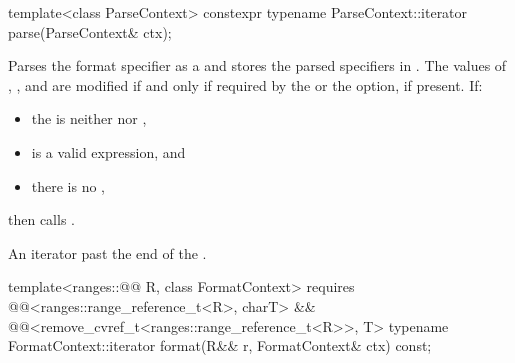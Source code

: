 %
\begin{itemdecl}
template<class ParseContext>
  constexpr typename ParseContext::iterator
    parse(ParseContext& ctx);
\end{itemdecl}

\begin{itemdescr}
\pnum
\effects
Parses the format specifier as a  and
stores the parsed specifiers in .
The values of
, , and 
are modified if and only if required by
the  or the  option, if present.
If:
\begin{itemize}
\item
the  is neither  nor ,
\item
{} is a valid expression, and
\item
there is no ,
\end{itemize}
then calls .

\pnum
\returns
An iterator past the end of the .
\end{itemdescr}

%
\begin{itemdecl}
template<ranges::@@ R, class FormatContext>
    requires @@<ranges::range_reference_t<R>, charT> &&
             @@<remove_cvref_t<ranges::range_reference_t<R>>, T>
  typename FormatContext::iterator
    format(R&& r, FormatContext& ctx) const;
\end{itemdecl}

